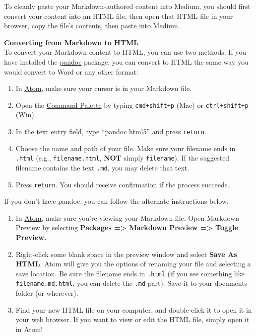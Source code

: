 \documentclass[]{book}
\providecommand{\tightlist}{%
  \setlength{\itemsep}{0pt}\setlength{\parskip}{0pt}}
\theoremstyle{definition}
\theoremstyle{definition}
\theoremstyle{definition}
\theoremstyle{remark}
\begin{document}
To cleanly paste your Markdown-authored content into Medium, you should
first convert your content into an HTML file, then open that HTML file
in your browser, copy the file's contents, then paste into Medium.

\textbf{Converting from Markdown to HTML}\\
To convert your Markdown content to HTML, you can use two methods. If
you have installed the
\href{https://andylaut.github.io/3844-guidebook/atom.html\#setting-up-atom-and-installing-packages}{pandoc}
package, you can convert to HTML the same way you would convert to Word
or any other format:

\begin{enumerate}
\def\labelenumi{\arabic{enumi}.}
\tightlist
\item
  In \href{https://andylaut.github.io/3844-guidebook/atom.htm}{Atom},
  make sure your cursor is in your Markdown file.
\item
  Open the
  \href{https://andylaut.github.io/3844-guidebook/atom.html\#command-palette}{Command
  Palette} by typing \texttt{cmd+shift+p} (Mac) or \texttt{ctrl+shift+p}
  (Win).
\item
  In the text entry field, type ``pandoc html5'' and press
  \texttt{return}.
\item
  Choose the name and path of your file. Make sure your filename ends in
  \texttt{.html} (e.g., \texttt{filename.html}, \textbf{NOT} simply
  \texttt{filename}). If the suggested filename contains the text
  \texttt{.md}, you may delete that text.
\item
  Press \texttt{return}. You should receive confirmation if the process
  succeeds.
\end{enumerate}

If you don't have pandoc, you can follow the alternate instructions
below.

\begin{enumerate}
\def\labelenumi{\arabic{enumi}.}
\tightlist
\item
  In \href{https://andylaut.github.io/3844-guidebook/atom.htm}{Atom},
  make sure you're viewing your Markdown file. Open Markdown Preview by
  selecting \textbf{Packages =\textgreater{} Markdown Preview
  =\textgreater{} Toggle Preview.}
\item
  Right-click some blank space in the preview window and select
  \textbf{Save As HTML}. Atom will give you the options of renaming your
  file and selecting a save location. Be sure the filename ends in
  \texttt{.html} (if you see something like \texttt{filename.md.html},
  you can delete the \texttt{.md} part). Save it to your documents
  folder (or wherever).
\item
  Find your new HTML file on your computer, and double-click it to open
  it in your web browser. If you want to view or edit the HTML file,
  simply open it in Atom!
\end{enumerate}
\end{document}
